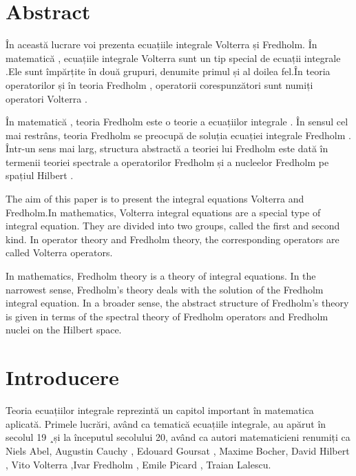 \documentclass[a4paper,12pt,oneside]{report}
\begin{document}
\maketitle

\tableofcontents

\newpage
{}

\chapter*{Abstract}

În această lucrare voi prezenta ecuațiile integrale Volterra și Fredholm. În matematică , ecuațiile integrale Volterra sunt un tip special de ecuații integrale .Ele sunt împărțite în două grupuri, denumite primul și al doilea fel.În teoria operatorilor și în teoria Fredholm , operatorii corespunzători sunt numiți operatori Volterra . 

În matematică , teoria Fredholm este o teorie a ecuațiilor integrale . În sensul cel mai restrâns, teoria Fredholm se preocupă de soluția ecuației integrale Fredholm . Într-un sens mai larg, structura abstractă a teoriei lui Fredholm este dată în termenii teoriei spectrale a operatorilor Fredholm și a nucleelor Fredholm pe spațiul Hilbert .

The aim of this paper is to present the integral equations Volterra and Fredholm.In mathematics, Volterra integral equations are a special type of integral equation. They are divided into two groups, called the first and second kind. In operator theory and Fredholm theory, the corresponding operators are called Volterra operators. 

In mathematics, Fredholm theory is a theory of integral equations. In the narrowest sense, Fredholm's theory deals with the solution of the Fredholm integral equation. In a broader sense, the abstract structure of Fredholm's theory is given in terms of the spectral theory of Fredholm operators and Fredholm nuclei on the Hilbert space.

\chapter*{Introducere}

Teoria ecuațiilor integrale reprezintă un capitol important în matematica aplicată. Primele lucrări, având ca tematică ecuațiile integrale, au apărut în secolul 19 ¸și la începutul secolului 20, având ca autori matematicieni renumiți ca Niels Abel, Augustin Cauchy , Edouard Goursat , Maxime Bocher, David Hilbert , Vito Volterra ,Ivar Fredholm , Emile Picard , Traian Lalescu.
\end{document}
